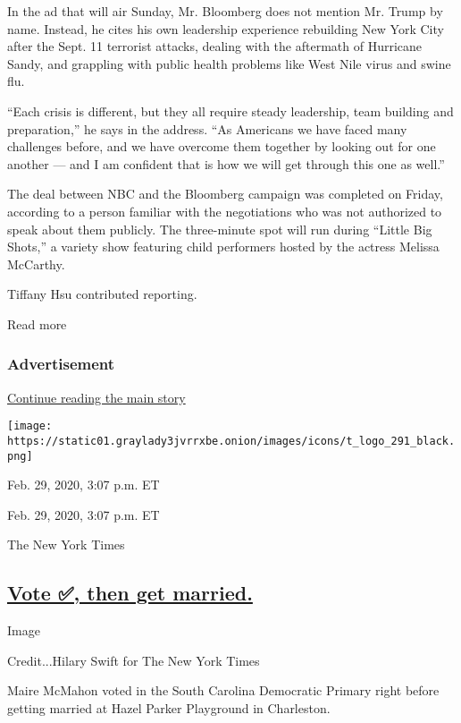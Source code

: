In the ad that will air Sunday, Mr. Bloomberg does not mention Mr. Trump
by name. Instead, he cites his own leadership experience rebuilding New
York City after the Sept. 11 terrorist attacks, dealing with the
aftermath of Hurricane Sandy, and grappling with public health problems
like West Nile virus and swine flu.

``Each crisis is different, but they all require steady leadership, team
building and preparation,'' he says in the address. ``As Americans we
have faced many challenges before, and we have overcome them together by
looking out for one another --- and I am confident that is how we will
get through this one as well.''

The deal between NBC and the Bloomberg campaign was completed on Friday,
according to a person familiar with the negotiations who was not
authorized to speak about them publicly. The three-minute spot will run
during ``Little Big Shots,'' a variety show featuring child performers
hosted by the actress Melissa McCarthy.

Tiffany Hsu contributed reporting.

Read more

\hypertarget{advertisement-5}{%
\subsubsection{Advertisement}\label{advertisement-5}}

\protect\hyperlink{after-dfp-ad-mid6}{Continue reading the main story}

\texttt{[image: https://static01.graylady3jvrrxbe.onion/images/icons/t\_logo\_291\_black.png]}

Feb. 29, 2020, 3:07 p.m. ET

Feb. 29, 2020, 3:07 p.m. ET

The New York Times

\hypertarget{vote--then-get-married}{%
\subsection{\texorpdfstring{\protect\hyperlink{vote-then-get-married}{Vote
✅, then get
married.}}{Vote ✅, then get married.}}\label{vote--then-get-married}}

Image

Credit...Hilary Swift for The New York Times

Maire McMahon voted in the South Carolina Democratic Primary right
before getting married at Hazel Parker Playground in Charleston.

